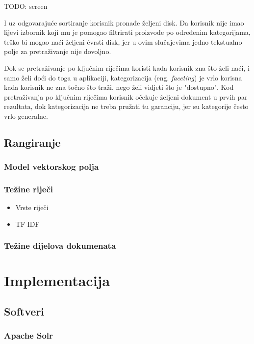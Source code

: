 \documentclass[11pt]{scrreprt}
\begin{document}
TODO: screen

I uz odgovarajuće sortiranje korisnik pronađe željeni disk. Da korisnik nije imao lijevi izbornik koji mu je pomogao filtrirati proizvode po određenim kategorijama, teško bi mogao naći željeni čvrsti disk, jer u ovim slučajevima jedno tekstualno polje za pretraživanje nije dovoljno.

Dok se pretraživanje po ključnim riječima koristi kada korisnik zna što želi naći, i samo želi doći do toga u aplikaciji, kategorizacija (eng. \textit{faceting}) je vrlo korisna kada korisnik ne zna točno što traži, nego želi vidjeti što je "dostupno". Kod pretraživanja po ključnim riječima korisnik očekuje željeni dokument u prvih par rezultata, dok kategorizacija ne treba pružati tu garanciju, jer su kategorije često vrlo generalne.

\section{Rangiranje}

\subsection{Model vektorskog polja}

\subsection{Težine riječi}

\begin{itemize}
  \item Vrste riječi
  \item TF-IDF
\end{itemize}

\subsection{Težine dijelova dokumenata}

\chapter{Implementacija}

\section{Softveri}

\subsection{Apache Solr}
\end{document}
